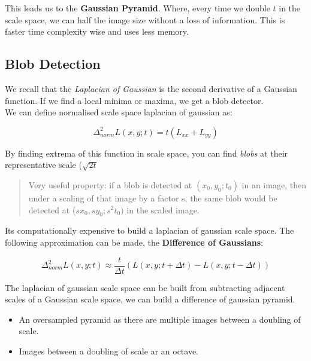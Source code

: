 This leads us to the \textbf{Gaussian Pyramid}. Where, every time we double $t$ in the scale space, we can half the image size without a loss of information. This is faster time complexity wise and uses less memory.

\subsection{Blob Detection}

We recall that the \textit{Laplacian of Gaussian} is the second derivative of a Gaussian function. If we find a local minima or maxima, we get a blob detector. \\



\noindent We can define normalised scale space laplacian of gaussian as:

\begin{equation}
    \Delta_{norm}^{2}L(x,y;t) = t(L_{xx}+L_{yy})
\end{equation}

\noindent By finding extrema of this function in scale space, you can find \textit{blobs} at their representative scale ($\sqrt{2t}$

\begin{quote}
     Very useful property: if a blob is detected at $(x_0, y_0; t_0)$ in an image, then under a scaling of that image by a factor s, the same blob would be detected at ($sx_0, sy_0; s^{2}t_0)$ in the scaled image.
\end{quote}

\noindent Its computationally expensive to build a laplacian of gaussian scale space. The following approximation can be made, the \textbf{Difference of Gaussians}:

\begin{equation}
    \Delta_{norm}^2 L(x,y;t) \approx \frac{t}{\Delta t}(L(x,y;t+\Delta t) - L(x,y;t-\Delta t))
\end{equation}

\noindent The laplacian of gaussian scale space can be built from subtracting adjacent scales of a Gaussian scale space, we can build a difference of gaussian pyramid.

\begin{itemize}
    \itemsep0em
    \item An oversampled pyramid as there are multiple images between a doubling of scale.
    \item Images between a doubling of scale ar an octave.
\end{itemize}